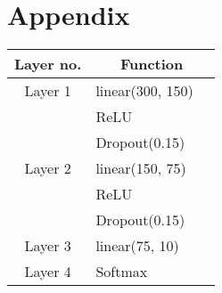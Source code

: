\documentclass{article}
\begin{document}
\section{Appendix}
\begin{tabular}[H]{c l @{} l}
\centering
Layer no.       &
\multicolumn{2}{c}{Function} \\
\hline
Layer 1     & linear(300, 150) \\
            & ReLU \\
            & Dropout(0.15) \\
Layer 2     & linear(150, 75) \\ 
            & ReLU \\
            & Dropout(0.15) \\
Layer 3     & linear(75, 10) \\ 
Layer 4     & Softmax\\ 
\end{tabular}\\ 
\end{document}
